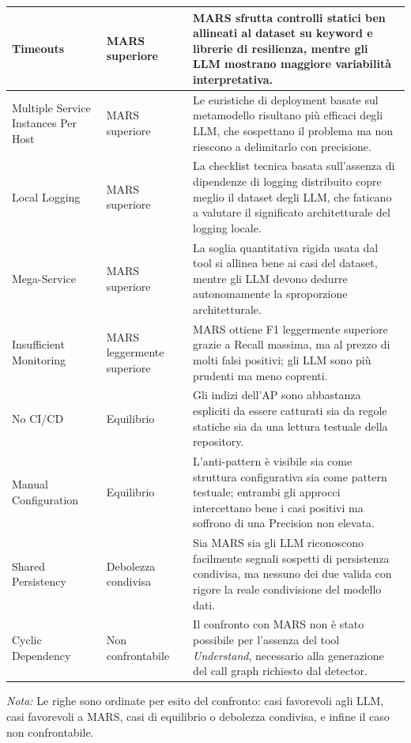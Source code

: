 \begin{table}[H]
\begin{tabular}{| >{\raggedright\arraybackslash}p{3.4cm} | >{\raggedright\arraybackslash}p{3.0cm} | >{\raggedright\arraybackslash}p{7.8cm} |}
Timeouts & MARS superiore & MARS sfrutta controlli statici ben allineati al dataset su keyword e librerie di resilienza, mentre gli LLM mostrano maggiore variabilità interpretativa. \\ \hline

Multiple Service Instances Per Host & MARS superiore & Le euristiche di deployment basate sul metamodello risultano più efficaci degli LLM, che sospettano il problema ma non riescono a delimitarlo con precisione. \\ \hline

Local Logging & MARS superiore & La checklist tecnica basata sull'assenza di dipendenze di logging distribuito copre meglio il dataset degli LLM, che faticano a valutare il significato architetturale del logging locale. \\ \hline

Mega-Service & MARS superiore & La soglia quantitativa rigida usata dal tool si allinea bene ai casi del dataset, mentre gli LLM devono dedurre autonomamente la sproporzione architetturale. \\ \hline

Insufficient Monitoring & MARS leggermente superiore & MARS ottiene F1 leggermente superiore grazie a Recall massima, ma al prezzo di molti falsi positivi; gli LLM sono più prudenti ma meno coprenti. \\ \hline

No CI/CD & Equilibrio & Gli indizi dell'AP sono abbastanza espliciti da essere catturati sia da regole statiche sia da una lettura testuale della repository. \\ \hline

Manual Configuration & Equilibrio & L'anti-pattern è visibile sia come struttura configurativa sia come pattern testuale; entrambi gli approcci intercettano bene i casi positivi ma soffrono di una Precision non elevata. \\ \hline

Shared Persistency & Debolezza condivisa & Sia MARS sia gli LLM riconoscono facilmente segnali sospetti di persistenza condivisa, ma nessuno dei due valida con rigore la reale condivisione del modello dati. \\ \hline

Cyclic Dependency & Non confrontabile & Il confronto con MARS non è stato possibile per l'assenza del tool \textit{Understand}, necessario alla generazione del call graph richiesto dal detector. \\ \hline

\end{tabular}

\begin{minipage}{0.98\textwidth}
\footnotesize
\textit{Nota:} Le righe sono ordinate per esito del confronto: casi favorevoli 
agli LLM, casi favorevoli a MARS, casi di equilibrio o debolezza condivisa, 
e infine il caso non confrontabile.
\end{minipage}
\end{table}


